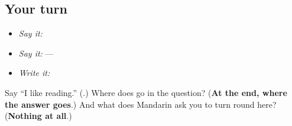 \subsection*{Your turn}
\begin{itemize}
\raggedright
  \item \emph{Say it:}  
  \item \emph{Say it:}  — 
  \item \emph{Write it:}  
\end{itemize}

\begin{tcolorbox}[breakable,colback=teal!4,colframe=teal!35!black,title={Before you move on}]
Say \textquotedblleft{}I like reading.\textquotedblright{} (\textbf{}.) Where does  go in the question? (\textbf{At the end, where the answer goes}.) And what does Mandarin ask you to turn round here? (\textbf{Nothing at all}.)
\end{tcolorbox}
